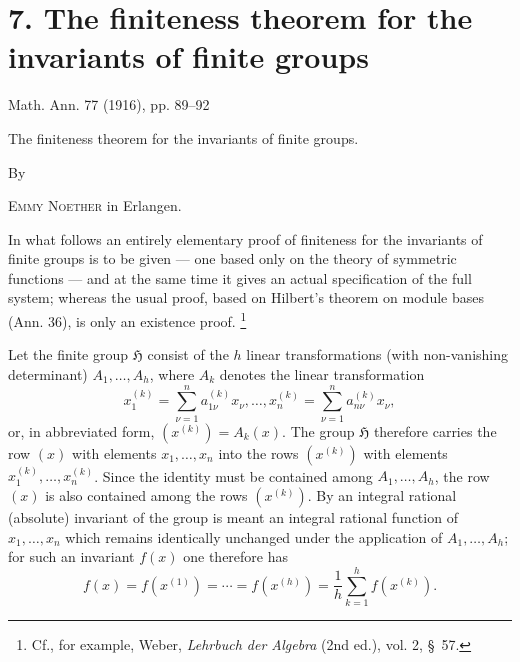 \documentclass[11pt]{article}
\providecommand{\Hgrp}{\mathfrak{H}}
\providecommand{\NoetherSrcNote}[2]{%
  \begingroup
  \renewcommand{\thefootnote}{#1}%
  \footnote{#2}%
  \addtocounter{footnote}{-1}%
  \endgroup}
\begin{document}
\section*{7. The finiteness theorem for the invariants of finite groups}
\begin{center}
Math. Ann. 77 (1916), pp. 89--92
\end{center}

\begin{center}
{\Large The finiteness theorem for the invariants of finite groups.}\par
\vspace{1.2em}
By\par
\vspace{0.8em}
{\scshape Emmy Noether} in Erlangen.
\end{center}

In what follows an entirely elementary proof of finiteness for the invariants of finite groups is to be given --- one based only on the theory of symmetric functions --- and at the same time it gives an actual specification of the full system; whereas the usual proof, based on Hilbert's theorem on module bases (Ann. 36), is only an existence proof.\NoetherSrcNote{*)}{Cf., for example, Weber, \emph{Lehrbuch der Algebra} (2nd ed.), vol. 2, \S\ 57.}

Let the finite group $\Hgrp$ consist of the $h$ linear transformations (with non-vanishing determinant) $A_1,\ldots,A_h$, where $A_k$ denotes the linear transformation
\[
  x_1^{(k)}=\sum_{\nu=1}^{n}a_{1\nu}^{(k)}x_\nu,\ldots,
  x_n^{(k)}=\sum_{\nu=1}^{n}a_{n\nu}^{(k)}x_\nu,
\]
or, in abbreviated form, $(x^{(k)})=A_k(x)$. The group $\Hgrp$ therefore carries the row $(x)$ with elements $x_1,
\ldots,x_n$ into the rows $(x^{(k)})$ with elements $x_1^{(k)},
\ldots,x_n^{(k)}$. Since the identity must be contained among $A_1,
\ldots,A_h$, the row $(x)$ is also contained among the rows $(x^{(k)})$. By an integral rational (absolute) invariant of the group is meant an integral rational function of $x_1,
\ldots,x_n$ which remains identically unchanged under the application of $A_1,
\ldots,A_h$; for such an invariant $f(x)$ one therefore has
\begin{equation}
  f(x)=f(x^{(1)})=\cdots=f(x^{(h)})=
  \frac1h\sum_{k=1}^{h}f(x^{(k)}).
\tag{1}
\end{equation}
\end{document}
